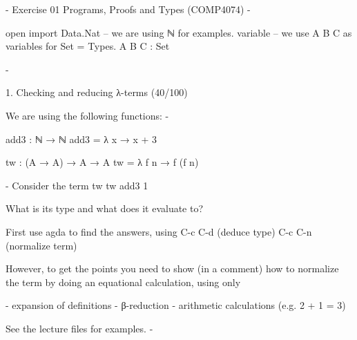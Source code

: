 {- Exercise 01 Programs, Proofs and Types (COMP4074) -}

open import Data.Nat -- we are using ℕ for examples.
variable -- we use A B C as variables for Set = Types.
  A B C : Set

{-

1. Checking and reducing λ-terms (40/100)

We are using the following functions:
-}

add3 : ℕ → ℕ
add3 = λ x → x + 3

tw : (A → A) → A → A
tw = λ f n → f (f n)

{- Consider the term
tw tw add3 1

What is its type and what does it evaluate to?


First use agda to find the answers, using
C-c C-d (deduce type)
C-c C-n (normalize term)

However, to get the points you need to show (in a comment) how to
  normalize the term by doing an equational calculation, using only
 
- expansion of definitions
- β-reduction
- arithmetic calculations (e.g. 2 + 1 = 3)

See the lecture files for examples.
-}

